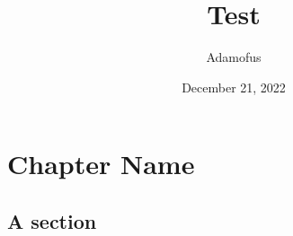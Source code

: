 \documentclass[a4paper,12pt]{book}
\begin{document}
\title{\Large{\textbf{Test}}}
\author{Adamofus}
\date{December 21, 2022}
\maketitle
\let\cleardoublepage\clearpage
\tableofcontents

	
\setcounter{page}{2}


\chapter{Chapter Name}
\blindmathtrue
\blindtext[5]
\section{A section}
\blindtext
\end{document}
